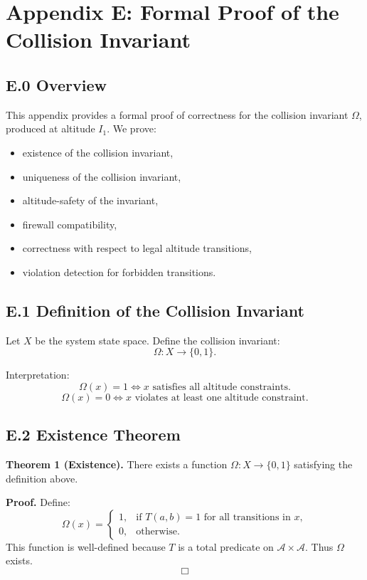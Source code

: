\appendix
\section*{Appendix E: Formal Proof of the Collision Invariant}

\subsection*{E.0 Overview}

This appendix provides a formal proof of correctness for the collision
invariant $\Omega$, produced at altitude $I_1$.  
We prove:
\begin{itemize}
    \item existence of the collision invariant,
    \item uniqueness of the collision invariant,
    \item altitude-safety of the invariant,
    \item firewall compatibility,
    \item correctness with respect to legal altitude transitions,
    \item violation detection for forbidden transitions.
\end{itemize}

\subsection*{E.1 Definition of the Collision Invariant}

Let $X$ be the system state space.  
Define the collision invariant:
\[
\Omega : X \to \{0,1\}.
\]

Interpretation:
\[
\Omega(x)=1 \iff x \text{ satisfies all altitude constraints}.
\]
\[
\Omega(x)=0 \iff x \text{ violates at least one altitude constraint}.
\]

\subsection*{E.2 Existence Theorem}

\textbf{Theorem 1 (Existence).}  
There exists a function $\Omega : X \to \{0,1\}$ satisfying the definition above.

\textbf{Proof.}  
Define:
\[
\Omega(x) = 
\begin{cases}
1, & \text{if } T(a,b)=1 \text{ for all transitions in } x, \\
0, & \text{otherwise}.
\end{cases}
\]
This function is well-defined because $T$ is a total predicate on
$\mathcal{A} \times \mathcal{A}$.  
Thus $\Omega$ exists.  
\[
\Box
\]

